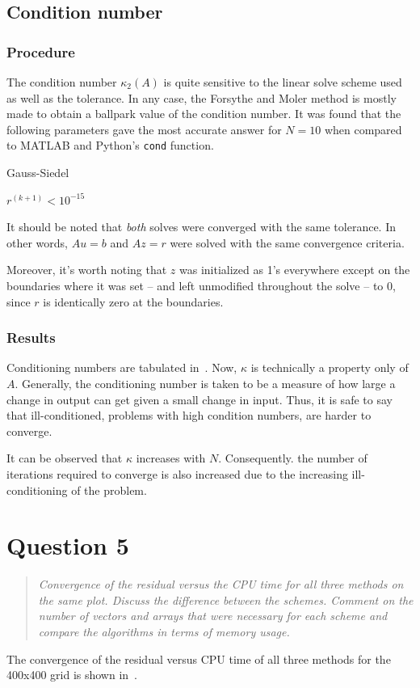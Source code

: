 \documentclass{SelimArticle}
\begin{document}
\subsection{Condition number}
\subsubsection{Procedure}
The condition number $\kappa_2(A)$ is quite sensitive to the linear solve scheme used as well as the tolerance.
In any case, the Forsythe and Moler method is mostly made to obtain a ballpark value of the condition number.
It was found that the following parameters gave the most accurate answer for $N=10$ when compared
to MATLAB and Python's \texttt{cond} function.
\begin{description}[noitemsep]
    \item[Scheme:] Gauss-Siedel
    \item[Convergence Criteria:] $r^{(k+1)} < 10^{-15}$
\end{description}
It should be noted that \textit{both} solves were converged with the same tolerance. In other words, $Au=b$ and
$Az=r$ were solved with the same convergence criteria.

Moreover, it's worth noting that $z$ was initialized as 1's everywhere except on the boundaries where it was set -- and
left unmodified throughout the solve -- to 0, since $r$ is identically zero at the boundaries.
\subsubsection{Results}

Conditioning numbers are tabulated in~. Now, $\kappa$ is technically a property
only of $A$. Generally, the conditioning number is taken to be a
measure of how large a change in output can get given a small change in input. Thus, it is safe to say that
ill-conditioned, problems with high condition numbers, are harder to converge.

It can be observed that $\kappa$ increases with $N$. Consequently. the number of iterations required to converge
is also increased due to the increasing ill-conditioning of the problem.


\newpage
\section{Question 5}
\begin{quote}
    \textit{Convergence of the residual versus the CPU time for all three methods on the same
        plot. Discuss the difference between the schemes. Comment on the number of vectors
        and arrays that were necessary for each scheme and compare the algorithms in terms
        of memory usage.}
\end{quote}
The convergence of the residual versus CPU time of all three methods for the 400x400 grid is shown
in~.
\end{document}
